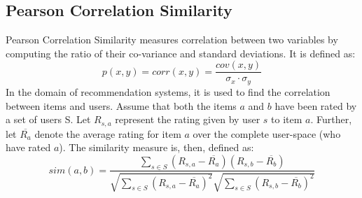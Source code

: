 \subsection{Pearson Correlation Similarity}
Pearson Correlation Similarity measures correlation between two variables by computing the ratio of their co-variance and standard deviations. It is defined as:
\begin{equation}
p(x, y)=corr(x, y)=\frac{cov(x, y)}{\sigma_x\cdot\sigma_y} \nonumber
\end{equation}
In the domain of recommendation systems, it is used to find the correlation between items and users. Assume that both the items $a$ and $b$ have been rated by a set of users S. Let $R_{s,a}$ represent the rating given by user $s$ to item $a$. Further, let $\overline{R_a}$ denote the average rating for item $a$ over the complete user-space (who have rated $a$). The similarity measure is, then, defined as:
\begin{equation}
sim(a,b)=\frac{\sum_{s\in S} (R_{s,a}-\overline{R_a})(R_{s,b}-\overline{R_b})}{\sqrt{\sum_{s\in S} (R_{s,a}-\overline{R_a})^2}\sqrt{\sum_{s\in S} (R_{s,b}-\overline{R_b})^2}}
\end{equation}



